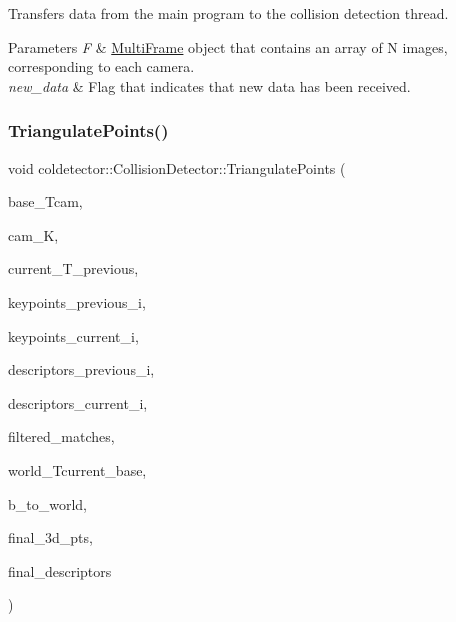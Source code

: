 Transfers data from the main program to the collision detection thread. 


\begin{DoxyParams}{Parameters}
{\em F} & \hyperlink{classMultiFrame}{Multi\+Frame} object that contains an array of N images, corresponding to each camera. \\
\hline
{\em new\+\_\+data} & Flag that indicates that new data has been received. \\
\hline
\end{DoxyParams}
\mbox{\label{classcoldetector_1_1CollisionDetector_a9b07097107a9acbf91bb5e338998d2c6}} 
\subsubsection{\texorpdfstring{Triangulate\+Points()}{TriangulatePoints()}}
{\footnotesize\ttfamily void coldetector\+::\+Collision\+Detector\+::\+Triangulate\+Points (\begin{DoxyParamCaption}\item[{const cv\+::\+Mat \&}]{base\+\_\+\+Tcam,  }\item[{const cv\+::\+Mat}]{cam\+\_\+K,  }\item[{const cv\+::\+Mat \&}]{current\+\_\+\+T\+\_\+previous,  }\item[{const std\+::vector$<$ cv\+::\+Key\+Point $>$ \&}]{keypoints\+\_\+previous\+\_\+i,  }\item[{const std\+::vector$<$ cv\+::\+Key\+Point $>$ \&}]{keypoints\+\_\+current\+\_\+i,  }\item[{const cv\+::\+Mat \&}]{descriptors\+\_\+previous\+\_\+i,  }\item[{const cv\+::\+Mat \&}]{descriptors\+\_\+current\+\_\+i,  }\item[{const std\+::vector$<$ cv\+::\+D\+Match $>$ \&}]{filtered\+\_\+matches,  }\item[{const cv\+::\+Mat \&}]{world\+\_\+\+Tcurrent\+\_\+base,  }\item[{bool}]{b\+\_\+to\+\_\+world,  }\item[{std\+::vector$<$ cv\+::\+Mat $>$ \&}]{final\+\_\+3d\+\_\+pts,  }\item[{cv\+::\+Mat \&}]{final\+\_\+descriptors }\end{DoxyParamCaption})}



